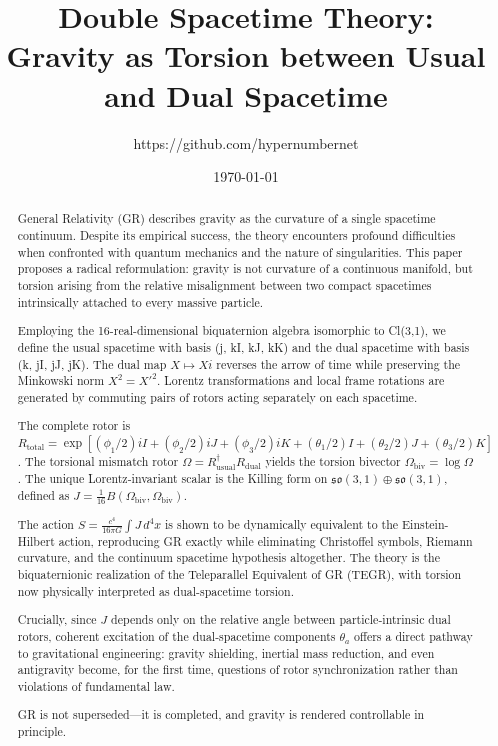 \documentclass[dvipdfmx,a4paper]{article}
\title{Double Spacetime Theory:\\ Gravity as Torsion between Usual and Dual Spacetime}
\author{https://github.com/hypernumbernet}
\date{\today}
\begin{document}
\maketitle

\begin{abstract}
General Relativity (GR) describes gravity as the curvature of a single spacetime continuum. Despite its empirical success, the theory encounters profound difficulties when confronted with quantum mechanics and the nature of singularities. This paper proposes a radical reformulation: gravity is not curvature of a continuous manifold, but torsion arising from the relative misalignment between two compact spacetimes intrinsically attached to every massive particle.

Employing the 16-real-dimensional biquaternion algebra isomorphic to Cl(3,1), we define the usual spacetime with basis (j, kI, kJ, kK) and the dual spacetime with basis (k, jI, jJ, jK). The dual map $X \mapsto Xi$ reverses the arrow of time while preserving the Minkowski norm $X^2 = X'^2$. Lorentz transformations and local frame rotations are generated by commuting pairs of rotors acting separately on each spacetime.

The complete rotor is $R_\text{total} = \exp[(\phi_1/2)iI + (\phi_2/2)iJ + (\phi_3/2)iK + (\theta_1/2)I + (\theta_2/2)J + (\theta_3/2)K]$.
The torsional mismatch rotor $\Omega = R^\dagger_\text{usual} R_\text{dual}$ yields the torsion bivector $\Omega_\text{biv} = \log \Omega$.
The unique Lorentz-invariant scalar is the Killing form on $\mathfrak{so}(3,1) \oplus \mathfrak{so}(3,1)$, defined as $J = \frac{1}{16} B(\Omega_\text{biv}, \Omega_\text{biv})$.

The action $S = \frac{c^4}{16\pi G} \int J \, d^4x$ is shown to be dynamically equivalent to the Einstein-Hilbert action, reproducing GR exactly while eliminating Christoffel symbols, Riemann curvature, and the continuum spacetime hypothesis altogether. The theory is the biquaternionic realization of the Teleparallel Equivalent of GR (TEGR), with torsion now physically interpreted as dual-spacetime torsion.

Crucially, since $J$ depends only on the relative angle between particle-intrinsic dual rotors, coherent excitation of the dual-spacetime components $\theta_a$ offers a direct pathway to gravitational engineering: gravity shielding, inertial mass reduction, and even antigravity become, for the first time, questions of rotor synchronization rather than violations of fundamental law.

GR is not superseded—it is completed, and gravity is rendered controllable in principle.
\end{abstract}
\end{document}
